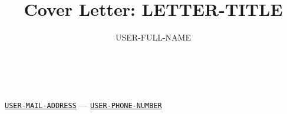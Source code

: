\documentclass[12pt]{article}
\renewcommand{\maketitle}{
  \begin{adjustwidth}{-35pt}{-35pt}
    \begin{center}
      {\Large\bfseries\thetitle} \\
      \vspace{0.75em}
      {\large\bfseries\theauthor} \\
      \vspace{0.75em}
      \large{
        \href{mailto:USER-MAIL-ADDRESS}{\tt USER-MAIL-ADDRESS}
        ---
        \href{tel:UGLY-USER-PHONE-NUMBER}{\tt USER-PHONE-NUMBER}
      }
    \end{center}
  \end{adjustwidth}
}
\begin{document}
\title{Cover Letter: LETTER-TITLE}
\author{USER-FULL-NAME}
\maketitle
\end{document}
